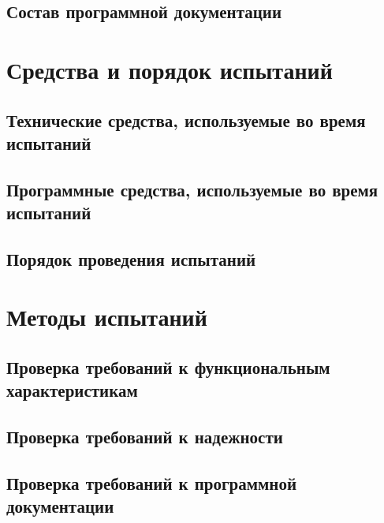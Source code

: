 \documentclass[a4paper,12pt]{article}
\begin{document}
	\subsection{Состав программной документации}
	
						\newpage
	\section{Средства и порядок испытаний}
	\subsection{Технические средства, используемые во время испытаний}
	\subsection{Программные средства, используемые во время испытаний}
	\subsection{Порядок проведения испытаний}
	
						\newpage
	\section{Методы испытаний}
	\subsection{Проверка требований к функциональным характеристикам}
	\subsection{Проверка требований к надежности}
	\subsection{Проверка требований к программной документации}
	
						\newpage
	\listRegistration
\end{document}

